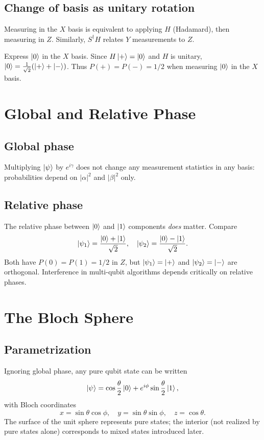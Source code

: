 \subsection{Change of basis as unitary rotation}

Measuring in the $X$ basis is equivalent to applying $H$ (Hadamard), then measuring in $Z$. Similarly, $S^\dagger H$ relates $Y$ measurements to $Z$.

\begin{example}
Express $\ket{0}$ in the $X$ basis. Since $H\ket{+}=\ket{0}$ and $H$ is unitary, $\ket{0}=\frac{1}{\sqrt{2}}(\ket{+}+\ket{-})$. Thus $P(+)=P(-)=1/2$ when measuring $\ket{0}$ in the $X$ basis.
\end{example}

\section{Global and Relative Phase}
\label{sec:phase}

\subsection{Global phase}

Multiplying $\ket{\psi}$ by $e^{i\gamma}$ does not change any measurement statistics in any basis: probabilities depend on $|\alpha|^2$ and $|\beta|^2$ only.

\subsection{Relative phase}

The relative phase between $\ket{0}$ and $\ket{1}$ components \emph{does} matter. Compare
\[
\ket{\psi_1}=\frac{\ket{0}+\ket{1}}{\sqrt{2}},\quad
\ket{\psi_2}=\frac{\ket{0}-\ket{1}}{\sqrt{2}}.
\]
Both have $P(0)=P(1)=1/2$ in $Z$, but $\ket{\psi_1}=\ket{+}$ and $\ket{\psi_2}=\ket{-}$ are orthogonal. Interference in multi-qubit algorithms depends critically on relative phases.

\section{The Bloch Sphere}
\label{sec:bloch}

\subsection{Parametrization}

Ignoring global phase, any pure qubit state can be written
\begin{equation}
\ket{\psi}=\cos\frac{\theta}{2}\ket{0} + e^{i\phi}\sin\frac{\theta}{2}\ket{1},
\label{eq:bloch-param}
\end{equation}
with Bloch coordinates
\begin{equation}
x=\sin\theta\cos\phi,\quad y=\sin\theta\sin\phi,\quad z=\cos\theta.
\label{eq:bloch-coords}
\end{equation}
The surface of the unit sphere represents pure states; the interior (not realized by pure states alone) corresponds to mixed states introduced later.

